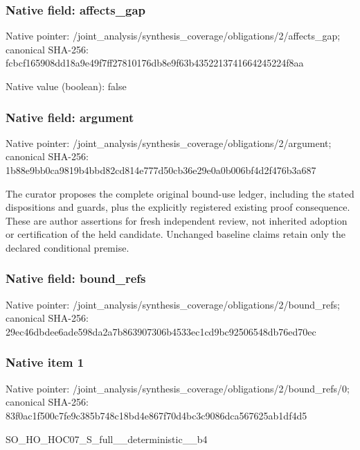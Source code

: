 \documentclass[10pt,a4paper]{article}
\begin{document}
\subsubsection{Native field: affects\_\allowbreak{}gap}
Native pointer: /joint\_\allowbreak{}analysis/synthesis\_\allowbreak{}coverage/obligations/2/affects\_\allowbreak{}gap; canonical SHA-256: fcbcf165908dd18a9e49f7ff27810176db8e9f63b4352213741664245224f8aa

Native value (boolean): false

\subsubsection{Native field: argument}
Native pointer: /joint\_\allowbreak{}analysis/synthesis\_\allowbreak{}coverage/obligations/2/argument; canonical SHA-256: 1b88e9bb0ca9819b4bbd82cd814e777d50cb36e29e0a0b006bf4d2f476b3a687

\begingroup\raggedright\sloppy The curator proposes the complete original bound-use ledger,\allowbreak{} including the stated dispositions and guards,\allowbreak{} plus the explicitly registered existing proof consequence. These are author assertions for fresh independent review,\allowbreak{} not inherited adoption or certification of the held candidate. Unchanged baseline claims retain only the declared conditional premise.\par\endgroup

\subsubsection{Native field: bound\_\allowbreak{}refs}
Native pointer: /joint\_\allowbreak{}analysis/synthesis\_\allowbreak{}coverage/obligations/2/bound\_\allowbreak{}refs; canonical SHA-256: 29ec46dbdee6ade598da2a7b863907306b4533ec1cd9bc92506548db76ed70ec

\subsubsection{Native item 1}
Native pointer: /joint\_\allowbreak{}analysis/synthesis\_\allowbreak{}coverage/obligations/2/bound\_\allowbreak{}refs/0; canonical SHA-256: 83f0ac1f500c7fe9c385b748c18bd4e867f70d4bc3c9086dca567625ab1df4d5

\begingroup\raggedright\sloppy SO\_\allowbreak{}HO\_\allowbreak{}HOC07\_\allowbreak{}S\_\allowbreak{}full\_\allowbreak{}\_\allowbreak{}deterministic\_\allowbreak{}\_\allowbreak{}b4\par\endgroup
\end{document}
